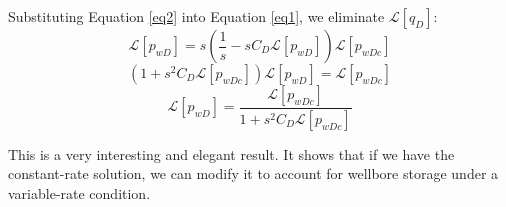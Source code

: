 \documentclass[letterpaper, 12pt]{article}
\theoremstyle{custom}
\begin{document}
Substituting Equation \ref{eq2} into Equation \ref{eq1}, we eliminate $\mathcal{L} \left[ q_D \right]$:
\begin{equation*}
  \mathcal{L} \left[ p_{wD} \right] = s \left( \frac{1}{s} - s C_D \mathcal{L} \left[ p_{wD} \right] \right) \mathcal{L} \left[ p_{wDc} \right]
\end{equation*}
\begin{equation*}
  \left( 1 + s^2 C_D \mathcal{L} \left[ p_{wDc} \right] \right)\mathcal{L} \left[ p_{wD} \right] = \mathcal{L} \left[ p_{wDc} \right]
\end{equation*}
\begin{equation*}
  \mathcal{L} \left[ p_{wD} \right] = \frac{\mathcal{L} \left[ p_{wDc} \right]}{1 + s^2 C_D \mathcal{L} \left[ p_{wDc} \right]}
\end{equation*}

This is a very interesting and elegant result.
It shows that if we have the constant-rate solution, we can modify it to account for wellbore storage under a variable-rate condition.
\end{document}
